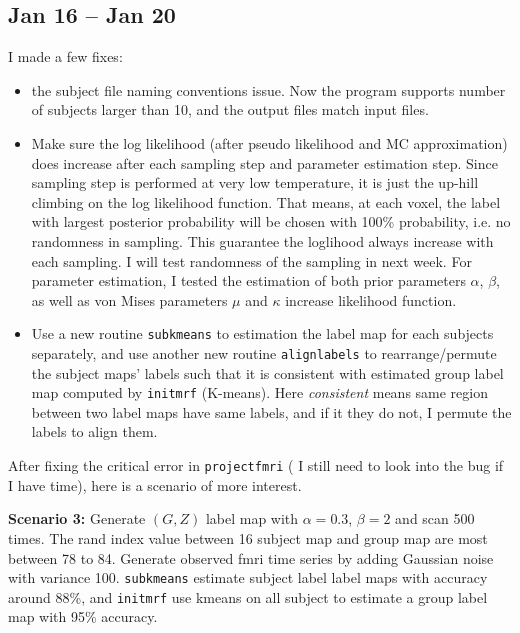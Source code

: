 \documentclass{article}
\begin{document}
\subsection{Jan 16 -- Jan 20}
I made a few fixes: 
\begin{itemize}

\item the subject file naming conventions issue. Now the program supports number of subjects larger than 10, and the output files match input files. 

\item Make sure the log likelihood (after pseudo likelihood and MC approximation) does increase after each sampling step and parameter estimation step. Since sampling step is performed at very low temperature, it is just the up-hill climbing on the log likelihood function. That means, at each voxel, the label with largest posterior probability will be chosen with 100\% probability, i.e. no randomness in sampling. This guarantee the loglihood always increase with each sampling. I will test randomness of the sampling in next week. For parameter estimation, I tested the estimation of both prior parameters $\alpha$, $\beta$, as well as von Mises parameters $\mu$ and $\kappa$ increase likelihood function. 

\item Use a new routine \texttt{subkmeans} to estimation the label map for each subjects separately, and use another new routine \texttt{alignlabels} to rearrange/permute the subject maps' labels such that it is consistent with estimated group label map computed by \texttt{initmrf} (K-means). Here \emph{consistent} means same region between two label maps have same labels, and if it they do not, I permute the labels to align them.

\end{itemize}

After fixing the critical error in \texttt{projectfmri} ( I still need to look into the bug if I have time), here is a scenario of more interest.

\textbf{Scenario 3: } Generate $(G,Z)$ label map with $\alpha=0.3$, $\beta=2$ and scan 500 times. The rand index value between 16 subject map and group map are most between 78 to 84. Generate observed fmri time series by adding Gaussian noise with variance 100. \texttt{subkmeans} estimate  subject label label maps with accuracy around 88\%, and \texttt{initmrf} use kmeans on all subject to estimate a group label map with 95\% accuracy. 
\end{document}
